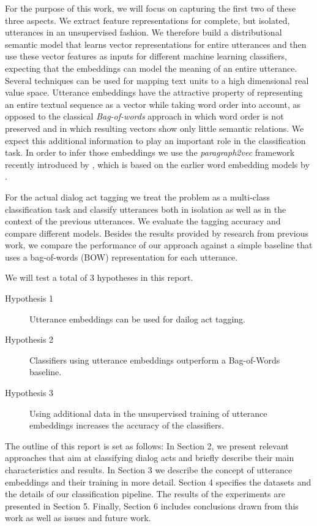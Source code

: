 For the purpose of this work, we will focus on capturing the first two of these three aspects. We extract feature representations for complete, but isolated, utterances in an unsupervised fashion.
We therefore build a distributional semantic model that learns vector representations for entire utterances and then use these vector features as inputs for different machine learning classifiers, expecting that the embeddings can model the meaning of an entire utterance.
Several techniques can be used for mapping text units to a high dimensional real value space.
Utterance embeddings have the attractive property of representing an entire textual sequence as a vector while taking word order into account, as opposed to the classical \emph{Bag-of-words} approach in which word order is not preserved and in which resulting vectors show only little semantic relations.
We expect this additional information to play an important role in the classification task. In order to infer those embeddings we use the \emph{paragraph2vec} framework recently introduced by , which is based on the earlier word embedding models by .

For the actual dialog act tagging we treat the problem as a multi-class classification task and classify utterances both in isolation as well as in the context of the previous utterances.
We evaluate the tagging accuracy and compare different models.
Besides the results provided by research from previous work, we compare the performance of our approach against a simple baseline that uses a bag-of-words (BOW) representation for each utterance. 

We will test a total of 3 hypotheses in this report.
\begin{description}
	\item[Hypothesis 1] Utterance embeddings can be used for dailog act tagging.
	\item[Hypothesis 2] Classifiers using utterance embeddings outperform a Bag-of-Words baseline.
	\item[Hypothesis 3] Using additional data in the unsupervised training of utterance embeddings increases the accuracy of the classifiers.
\end{description}

The outline of this report is set as follows: In Section 2, we present relevant approaches that aim at classifying dialog acts and briefly describe their main characteristics and results. In Section 3 we describe the concept of utterance embeddings and their training in more detail. Section 4 specifies the datasets and the details of our classification pipeline. The results of the experiments are presented in Section 5. Finally, Section 6 includes conclusions drawn from this work as well as issues and future work.
